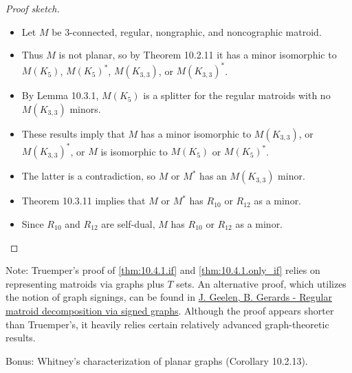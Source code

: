 \begin{proof}[Proof sketch]
  \begin{itemize}
    \item Let $M$ be $3$-connected, regular, nongraphic, and noncographic matroid.
    \item Thus $M$ is not planar, so by Theorem 10.2.11 it has a minor isomorphic to $M(K_{5})$, $M(K_{5})^{*}$, $M(K_{3,3})$, or $M(K_{3,3})^{*}$.
    \item By Lemma 10.3.1, $M(K_{5})$ is a splitter for the regular matroids with no $M(K_{3,3})$ minors.
    \item These results imply that $M$ has a minor isomorphic to $M(K_{3,3})$, or $M(K_{3,3})^{*}$, or $M$ is isomorphic to $M(K_{5})$ or $M(K_{5})^{*}$.
    \item The latter is a contradiction, so $M$ or $M^{*}$ has an $M(K_{3,3})$ minor.
    \item Theorem 10.3.11 implies that $M$ or $M^{*}$ has $R_{10}$ or $R_{12}$ as a minor.
    \item Since $R_{10}$ and $R_{12}$ are self-dual, $M$ has $R_{10}$ or $R_{12}$ as a minor.
  \end{itemize}
\end{proof}

Note: Truemper's proof of \ref{thm:10.4.1.if} and \ref{thm:10.4.1.only_if} relies on representing matroids via graphs plus $T$ sets. An alternative proof, which utilizes the notion of graph signings, can be found in \href{https://www.math.uwaterloo.ca/~jfgeelen/Publications/regular.pdf}{J. Geelen, B. Gerards - Regular matroid decomposition via signed graphs}. Although the proof appears shorter than Truemper's, it heavily relies certain relatively advanced graph-theoretic results.

Bonus: Whitney's characterization of planar graphs (Corollary 10.2.13).
